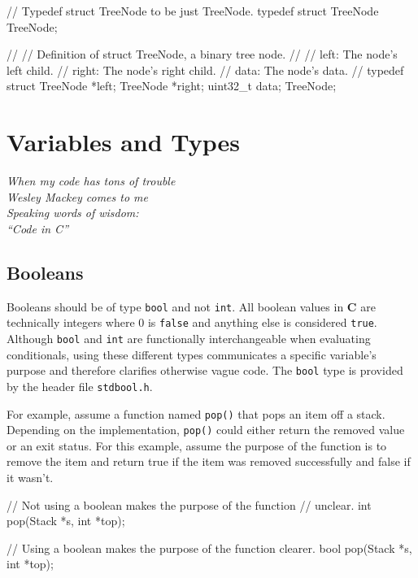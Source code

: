 \documentclass[11pt]{article}
\begin{document}
\begin{codelisting}{}
// Typedef struct TreeNode to be just TreeNode.
typedef struct TreeNode TreeNode;

//
// Definition of struct TreeNode, a binary tree node.
//
// left:   The node's left child.
// right:  The node's right child.
// data:   The node's data.
//
typedef struct {
    TreeNode *left;
    TreeNode *right;
    uint32_t data;
} TreeNode;
\end{codelisting}


\section{Variables and Types}

\textwidth
\epigraph{\emph{When my code has tons of trouble\\ Wesley Mackey comes to me\\
Speaking words of wisdom: \\ ``Code in C''}}{}


\subsection{Booleans}

\noindent Booleans should be of type \texttt{bool} and not \texttt{int}.  All
boolean values in \textbf{C} are technically integers where $0$ is
\texttt{false} and anything else is considered \texttt{true}. Although
\texttt{bool} and \texttt{int} are functionally interchangeable when evaluating
conditionals, using these different types communicates a specific variable's
purpose and therefore clarifies otherwise vague code. The \texttt{bool} type is
provided by the header file \texttt{stdbool.h}.

For example, assume a function named \texttt{pop()} that pops an item off a
stack. Depending on the implementation, \texttt{pop()} could either return the
removed value or an exit status. For this example, assume the purpose of the
function is to remove the item and return true if the item was removed
successfully and false if it wasn't.

\begin{codelisting}{}
// Not using a boolean makes the purpose of the function
// unclear. 
int pop(Stack *s, int *top);

// Using a boolean makes the purpose of the function clearer.
bool pop(Stack *s, int *top);
\end{codelisting}
\end{document}

